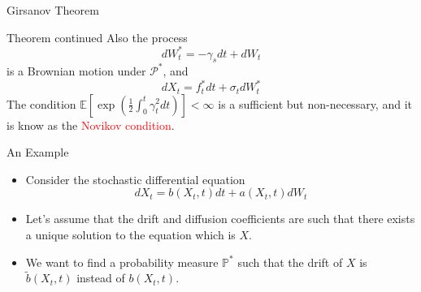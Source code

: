 \documentclass{beamer}
\begin{document}
\begin{frame}{Girsanov Theorem}
  \begin{block}{Theorem continued}
    Also the process
    \begin{equation}
      dW^*_t = -\gamma_s dt + dW_t
    \end{equation} 
    is a Brownian motion under $\mathcal{P}^*$, and 
    \begin{equation*}
      dX_t = f^*_t dt + \sigma_t dW^*_t
    \end{equation*}
    The condition $\mathbb{E}\left[\exp\left(\frac{1}{2}\int_0^t\gamma_t^2dt\right)\right]<\infty$ is a sufficient but non-necessary, and it is know as the \textcolor{red}{Novikov condition}.
  \end{block}
\end{frame}


\begin{frame}{An Example}
  \begin{itemize}
  \item Consider the stochastic differential equation
    \begin{equation*}
      dX_t = b(X_t, t) dt + a(X_t, t) dW_t
    \end{equation*}
  \item Let's assume that the drift and diffusion coefficients are such that there exists a unique solution to the equation which is $X$.
  \item We want to find a probability measure $\mathbb{P}^*$ such that the drift of $X$ is $\tilde{b}(X_t,t)$ instead of $b(X_t,t)$.
  \end{itemize}
\end{frame}
\end{document}
